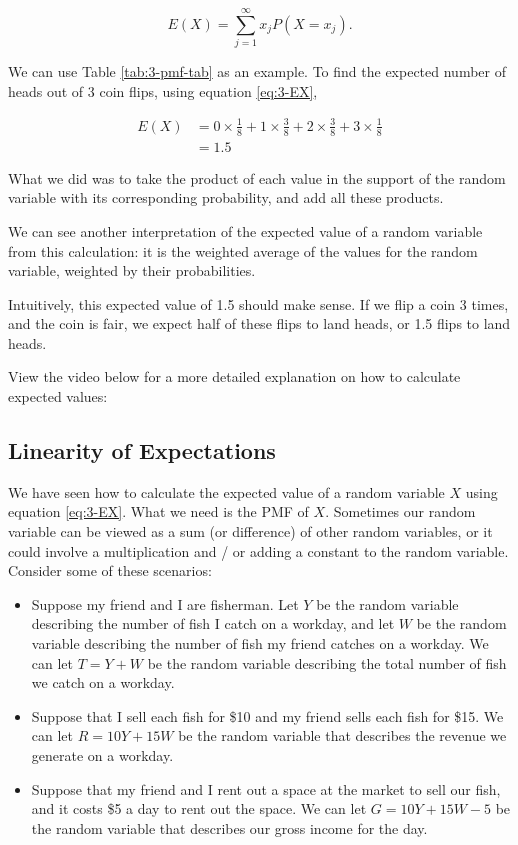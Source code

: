 \documentclass[
]{book}
\begin{document}
\begin{equation} 
E(X) = \sum_{j=1}^{\infty} x_j P(X=x_j).
\label{eq:3-EX}
\end{equation}

We can use Table \ref{tab:3-pmf-tab} as an example. To find the expected number of heads out of 3 coin flips, using equation \eqref{eq:3-EX},

\[
\begin{split}
E(X) &= 0 \times \frac{1}{8} + 1 \times \frac{3}{8} + 2 \times \frac{3}{8} + 3 \times \frac{1}{8}\\
       &= 1.5
\end{split}
\]

What we did was to take the product of each value in the support of the random variable with its corresponding probability, and add all these products.

We can see another interpretation of the expected value of a random variable from this calculation: it is the weighted average of the values for the random variable, weighted by their probabilities.

Intuitively, this expected value of 1.5 should make sense. If we flip a coin 3 times, and the coin is fair, we expect half of these flips to land heads, or 1.5 flips to land heads.

View the video below for a more detailed explanation on how to calculate expected values:

\hypertarget{linearity-of-expectations}{%
\subsection{Linearity of Expectations}\label{linearity-of-expectations}}

We have seen how to calculate the expected value of a random variable \(X\) using equation \eqref{eq:3-EX}. What we need is the PMF of \(X\). Sometimes our random variable can be viewed as a sum (or difference) of other random variables, or it could involve a multiplication and / or adding a constant to the random variable. Consider some of these scenarios:

\begin{itemize}
\item
  Suppose my friend and I are fisherman. Let \(Y\) be the random variable describing the number of fish I catch on a workday, and let \(W\) be the random variable describing the number of fish my friend catches on a workday. We can let \(T = Y+W\) be the random variable describing the total number of fish we catch on a workday.
\item
  Suppose that I sell each fish for \$10 and my friend sells each fish for \$15. We can let \(R = 10Y + 15W\) be the random variable that describes the revenue we generate on a workday.
\item
  Suppose that my friend and I rent out a space at the market to sell our fish, and it costs \$5 a day to rent out the space. We can let \(G = 10Y + 15W - 5\) be the random variable that describes our gross income for the day.
\end{itemize}
\end{document}
